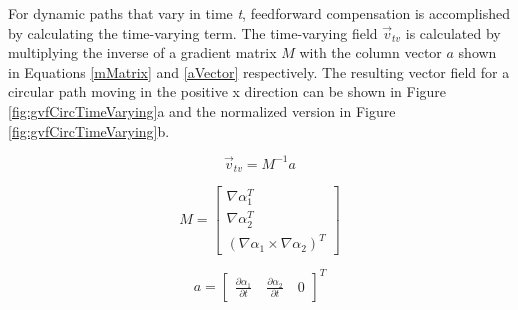 \documentclass[numbered,pdftex]{ohio-etd}
\begin{document}
For dynamic paths that vary in time \textit{t}, feedforward compensation is accomplished by calculating the time-varying term. The time-varying field $\vec{v}_{tv}$ is calculated by multiplying the inverse of a gradient matrix $M$ with the column vector $a$ shown in Equations \ref{mMatrix} and \ref{aVector} respectively. The resulting vector field for a circular path moving in the positive x direction can be shown in Figure \ref{fig:gvfCircTimeVarying}a and the normalized version in Figure \ref{fig:gvfCircTimeVarying}b.

\begin{equation}
\label{tv}
\vec{v}_{tv} = M^{-1}a
\end{equation}

\begin{equation}
\label{mMatrix}
M =\begin{bmatrix}
\nabla\alpha_1^T \\
\nabla\alpha_2^T \\
(\nabla\alpha_1 \times \nabla\alpha_2)^T
\end{bmatrix}
\end{equation}

\begin{equation}
\label{aVector}
a =\begin{bmatrix}
\frac{\partial \alpha_1}{\partial t} \quad   \frac{\partial \alpha_2}{\partial t} \quad   0
\end{bmatrix}^T
\end{equation}
\end{document}
